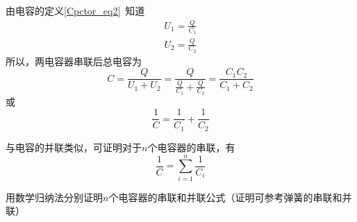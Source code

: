由电容的定义\autoref{Cpctor_eq2}~知道
\begin{equation}
\begin{aligned}
U_1=\frac{Q}{C_1}\\
U_2=\frac{Q}{C_2}
\end{aligned}
\end{equation}
所以，两电容器串联后总电容为
\begin{equation}
{C} = \frac{Q}{U_1+U_2} = \frac{Q}{\frac{Q}{C_1}+\frac{Q}{C_2}} = \frac{C_1C_2}{C_1 + C_2}
\end{equation}
或
\begin{equation}
\frac{1}{C}=\frac{1}{C_1}+\frac{1}{C_2}
\end{equation}

与电容的并联类似，可证明对于$n$个电容器的串联，有
\begin{equation}
\frac{1}{C}=\sum_{i=1}^{n}\frac{1}{C_i}
\end{equation}
\begin{exercise}{}
用数学归纳法分别证明$n$个电容器的串联和并联公式（证明可参考弹簧的串联和并联）
\end{exercise}

